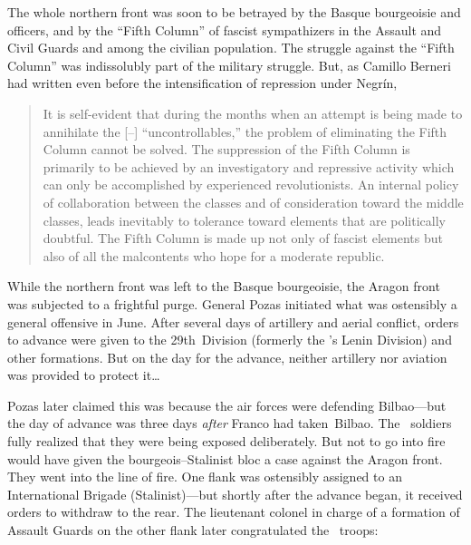 The whole northern front was soon to be betrayed by the Basque bourgeoisie and officers, and by the ``Fifth Column'' of fascist sympathizers in the Assault and Civil Guards and among the civilian population. The struggle against the ``Fifth Column'' was indissolubly part of the military struggle. But, as Camillo Berneri had written even before the intensification of repression under Negr\'in,

\begin{quotation}
  It is self-evident that during the months when an attempt is being made to annihilate the [\POUM--\CNT] “uncontrollables,” the problem of eliminating the Fifth Column cannot be solved. The suppression of the Fifth Column is primarily to be achiev\-ed by an investigatory and repressive activity which can only be accomplished by experienced revolutionists. An internal policy of collaboration between the classes and of consideration toward the middle classes, leads inevitably to tolerance toward elements that are politically doubtful. The Fifth Column is made up not only of fascist elements but also of all the malcontents who hope for a moderate republic.
\end{quotation}

While the northern front was left to the Basque bourgeoisie, the Aragon front was subjected to a frightful purge. General Pozas initiated what was ostensibly a general offensive in June. After several days of artillery and aerial conflict, orders to advance were given to the 29th~Division (formerly the \POUM’s Lenin Division) and other formations. But on the day for the advance, neither artillery nor aviation was provided to protect it\dots\

\indexSPozas{}\indexPOUM{}
Pozas later claimed this was because the air forces were defending Bilbao---but the day of advance was three days \emph{after} Franco had taken~Bilbao. The \POUM\ soldiers fully realized that they were being exposed deliberately. But not to go into fire would have given the bourgeois--Stalinist bloc a case against the Aragon front. They went into the line of fire. One flank was ostensibly assigned to an International Brigade (Stalinist)---but shortly after the advance began, it received orders to withdraw to the rear. The lieutenant colonel in charge of a formation of Assault Guards on the other flank later congratulated the \POUM\ troops: 

